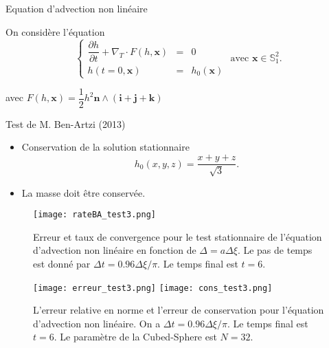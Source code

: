 \documentclass[11pt]{beamer}
\begin{document}
\begin{frame}{Equation d'advection non linéaire}

On considère l'équation
$$
\left\lbrace
\begin{array}{rcl}
\dfrac{\partial h}{\partial t} + \nabla_T \cdot F(h, \mathbf{x}) & = & 0  \\
h(t=0,\mathbf{x}) & = & h_0(\mathbf{x})
\end{array}
\right. \text{ avec } \mathbf{x} \in \mathbb{S}_1^2.
$$

avec $F(h, \mathbf{x}) = \dfrac{1}{2} h^2 \mathbf{n} \wedge (\mathbf{i} + \mathbf{j} + \mathbf{k})$ 

\begin{exampleblock}{Test de M. Ben-Artzi  (2013)}
\begin{itemize}
\item Conservation de la solution stationnaire 
$$
h_0(x,y,z) = \dfrac{x+y+z}{\sqrt{3}}.
$$
\item La masse doit être conservée.
\end{itemize}
\end{exampleblock}
\end{frame}



\begin{frame}
\begin{figure}[htbp]
\begin{center}
\texttt{[image: rateBA\_test3.png]}
\end{center}
\caption{Erreur et taux de convergence pour le test stationnaire de l'équation d'advection non linéaire en fonction de $\Delta = a \Delta \xi$. Le pas de temps est donné par $\Delta t = 0.96 \Delta \xi / \pi$. Le temps final est $t=6$.}
\label{fig:benartzi_test3}
\end{figure}
\end{frame}





\begin{frame}
\begin{figure}[htbp]
\begin{center}
\texttt{[image: erreur\_test3.png]}
\texttt{[image: cons\_test3.png]}
\end{center}
\caption{ L'erreur relative en norme et l'erreur de conservation pour l'équation d'advection non linéaire. On a $\Delta t = 0.96 \Delta \xi / \pi$. Le temps final est $t=6$. Le paramètre de la Cubed-Sphere est $N=32$.}
\label{fig:benartzi_test3_hist}
\end{figure}
\end{frame}
\end{document}
